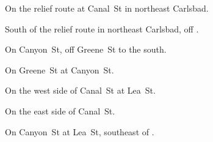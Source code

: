 
\begin{LocationList}

\Location{\GasStation \Gas}
On the relief route at Canal~St in northeast Carlsbad.

South of the relief route in northeast Carlsbad, off .

\Location{\RecruitmentAgency \Recruitment}
On Canyon~St, off  Greene~St to the south.

On  Greene~St at Canyon~St.

\Location{\TruckWash \Rest}
On the west side of   Canal~St at Lea~St.

On the east side of  Canal~St.

On Canyon~St at Lea~St, southeast of .

\end{LocationList}
